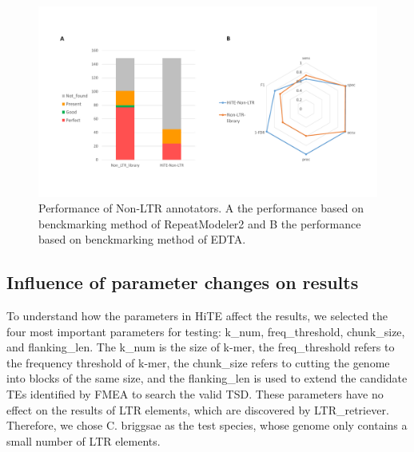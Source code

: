 \documentclass{bmcart}
\begin{document}
\begin{figure}[h!]
	\centerline{\includegraphics[width=1.0\textwidth]{figures/NonLTRResults.pdf}}
	\caption{Performance of Non-LTR annotators. A the performance based on benckmarking method of RepeatModeler2 and B the performance based on benckmarking method of EDTA.}
	\label{fig:non_ltr_results}
\end{figure}


\subsection*{Influence of parameter changes on results}
To understand how the parameters in HiTE affect the results, we selected the four most important parameters for testing: k\_num, freq\_threshold, chunk\_size, and flanking\_len. The k\_num is the size of k-mer, the freq\_threshold refers to the frequency threshold of k-mer, the chunk\_size refers to cutting the genome into blocks of the same size, and the flanking\_len is used to extend the candidate TEs identified by FMEA to search the valid TSD. These parameters have no effect on the results of LTR elements, which are discovered by LTR\_retriever. Therefore, we chose C. briggsae as the test species, whose genome only contains a small number of LTR elements.
\end{document}
